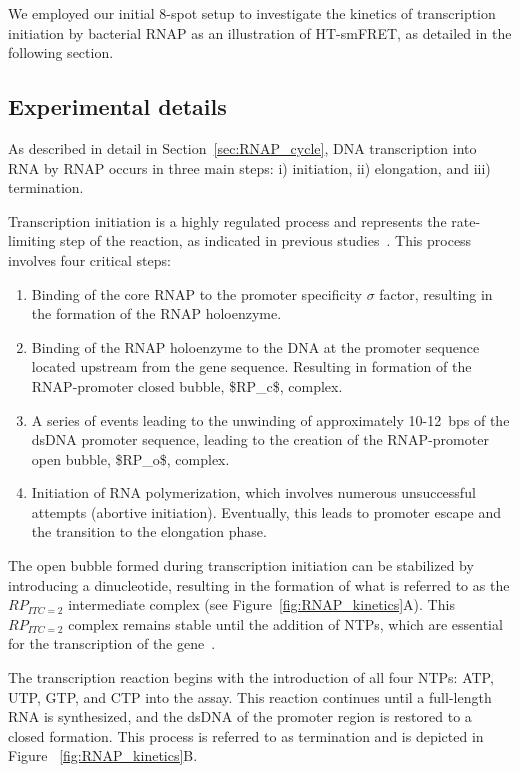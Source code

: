 We employed our initial 8-spot setup to investigate the kinetics of transcription initiation by bacterial \ac{RNAP} as an illustration of \ac{HT-smFRET}, as detailed in the following section.

\subsection{Experimental details}
\label{sec:exp_details_RNAP_kinetics}

As described in detail in Section~\ref{sec:RNAP_cycle}, DNA transcription into RNA by \ac{RNAP} occurs in three main steps: i) initiation, ii) elongation, and iii) termination.

Transcription initiation is a highly regulated process and represents the rate-limiting step of the reaction, as indicated in previous studies~\cite{murakami_structural_2002}. 
This process involves four critical steps:


\begin{enumerate}
\item Binding of the core \ac{RNAP} to the promoter specificity $\sigma$ factor, resulting in the formation of the \ac{RNAP} holoenzyme.
\item Binding of the \ac{RNAP} holoenzyme to the DNA at the promoter sequence located upstream from the gene sequence. 
Resulting in formation of the RNAP-promoter closed bubble, \ac{$RP_c$}, complex.
\item A series of events leading to the unwinding of approximately 10-12~\ac{bp}s of the \ac{dsDNA} promoter sequence, leading to the creation of the RNAP-promoter open bubble, \ac{$RP_o$}, complex.
\item Initiation of RNA polymerization, which involves numerous unsuccessful attempts (abortive initiation). 
Eventually, this leads to promoter escape and the transition to the elongation phase.
\end{enumerate}

The open bubble formed during transcription initiation can be stabilized by introducing a dinucleotide, resulting in the formation of what is referred to as the $RP_{ITC = 2}$ intermediate complex (see Figure~\ref{fig:RNAP_kinetics}A). This $RP_{ITC = 2}$ complex remains stable until the addition of \ac{NTP}s, which are essential for the transcription of the gene~\cite{lerner_PNAS_2016}.

The transcription reaction begins with the introduction of all four \ac{NTP}s: ATP, UTP, GTP, and CTP into the assay. 
This reaction continues until a full-length RNA is synthesized, and the \ac{dsDNA} of the promoter region is restored to a closed formation.
This process is referred to as termination and is depicted in Figure ~\ref{fig:RNAP_kinetics}B.

